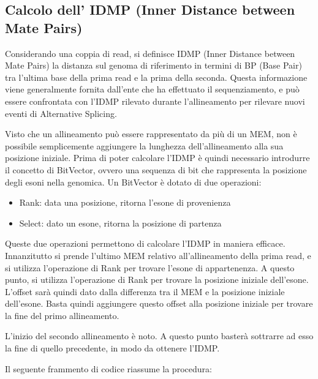 \newpage

\subsection{Calcolo dell' IDMP (Inner Distance between Mate Pairs)}
Considerando una coppia di read, si definisce IDMP (Inner Distance between Mate Pairs) la distanza sul genoma di riferimento in termini di BP (Base Pair) tra l'ultima base della prima read e la prima della seconda. Questa informazione viene generalmente fornita dall'ente che ha effettuato il sequenziamento, e può essere confrontata con l'IDMP rilevato durante l'allineamento per rilevare nuovi eventi di Alternative Splicing.

Visto che un allineamento può essere rappresentato da più di un MEM, non è possibile semplicemente aggiungere la lunghezza dell'allineamento alla sua posizione iniziale. Prima di poter calcolare l'IDMP è quindi necessario introdurre il concetto di BitVector, ovvero una sequenza di bit che rappresenta la posizione degli esoni nella genomica. Un BitVector è dotato di due operazioni:

\begin{itemize}
	\item Rank: data una posizione, ritorna l'esone di provenienza
	\item Select: dato un esone, ritorna la posizione di partenza 
\end{itemize}

Queste due operazioni permettono di calcolare l'IDMP in maniera efficace. Innanzitutto si prende l'ultimo MEM relativo all'allineamento della prima read, e si utilizza l'operazione di Rank per trovare l'esone di appartenenza. A questo punto, si utilizza l'operazione di Rank per trovare la posizione iniziale dell'esone. L'offset sarà quindi dato dalla differenza tra il MEM e la posizione iniziale dell'esone. Basta quindi aggiungere questo offset alla posizione iniziale per trovare la fine del primo allineamento.

L'inizio del secondo allineamento è noto. A questo punto basterà sottrarre ad esso la fine di quello precedente, in modo da ottenere l'IDMP.

Il seguente frammento di codice riassume la procedura:

